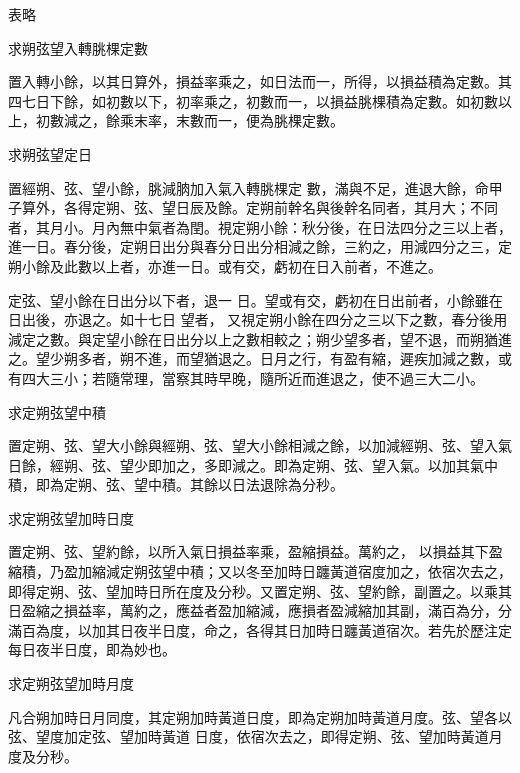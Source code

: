 \begin{pinyinscope}
 表略



 求朔弦望入轉朓棵定數



 置入轉小餘，以其日算外，損益率乘之，如日法而一，所得，以損益積為定數。其四七日下餘，如初數以下，初率乘之，初數而一，以損益朓棵積為定數。如初數以上，初數減之，餘乘末率，末數而一，便為朓棵定數。



 求朔弦望定日



 置經朔、弦、望小餘，朓減朒加入氣入轉朓棵定
 數，滿與不足，進退大餘，命甲子算外，各得定朔、弦、望日辰及餘。定朔前幹名與後幹名同者，其月大；不同者，其月小。月內無中氣者為閏。視定朔小餘：秋分後，在日法四分之三以上者，進一日。春分後，定朔日出分與春分日出分相減之餘，三約之，用減四分之三，定朔小餘及此數以上者，亦進一日。或有交，虧初在日入前者，不進之。



 定弦、望小餘在日出分以下者，退一
 日。望或有交，虧初在日出前者，小餘雖在日出後，亦退之。如十七日
 望者，
 又視定朔小餘在四分之三以下之數，春分後用減定之數。與定望小餘在日出分以上之數相較之；朔少望多者，望不退，而朔猶進之。望少朔多者，朔不進，而望猶退之。日月之行，有盈有縮，遲疾加減之數，或有四大三小；若隨常理，當察其時早晚，隨所近而進退之，使不過三大二小。



 求定朔弦望中積



 置定朔、弦、望大小餘與經朔、弦、望大小餘相減之餘，以加減經朔、弦、望入氣日餘，經朔、弦、望少即加之，多即減之。即為定朔、弦、望入氣。以加其氣中積，即為定朔、弦、望中積。其餘以日法退除為分秒。



 求定朔弦望加時日度



 置定朔、弦、望約餘，以所入氣日損益率乘，盈縮損益。萬約之，
 以損益其下盈縮積，乃盈加縮減定朔弦望中積；又以冬至加時日躔黃道宿度加之，依宿次去之，即得定朔、弦、望加時日所在度及分秒。又置定朔、弦、望約餘，副置之。以乘其日盈縮之損益率，萬約之，應益者盈加縮減，應損者盈減縮加其副，滿百為分，分滿百為度，以加其日夜半日度，命之，各得其日加時日躔黃道宿次。若先於歷注定每日夜半日度，即為妙也。



 求定朔弦望加時月度



 凡合朔加時日月同度，其定朔加時黃道日度，即為定朔加時黃道月度。弦、望各以弦、望度加定弦、望加時黃道
 日度，依宿次去之，即得定朔、弦、望加時黃道月度及分秒。




\end{pinyinscope}
